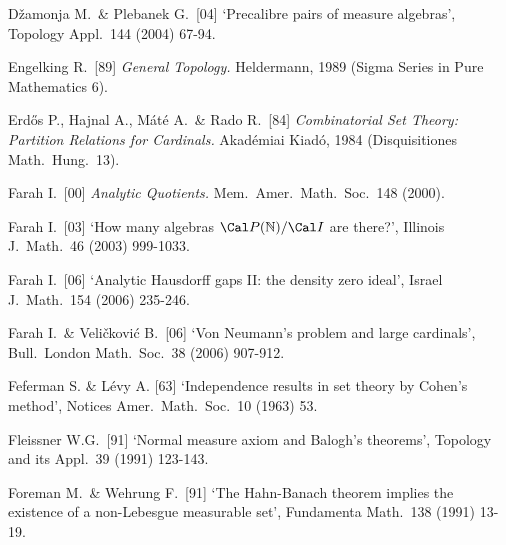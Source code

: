 {%

D\v{z}amonja M.\ \& Plebanek G.\ [04]
`Precalibre pairs of measure algebras',
Topology Appl.\ 144 (2004) 67-94.
\cmmnt{[525L.]}

\medskip%

Engelking R.\ [89] {\it General Topology.} Heldermann, 1989 (Sigma
Series in Pure Mathematics 6).
\cmmnt{[\S5A4.]}


Erd\H{o}s P., Hajnal A., M\'at\'e A.\ \& Rado R.\ [84] {\it Combinatorial
Set Theory:  Partition Relations for Cardinals.}   Akad\'emiai Kiad\'o,
1984 (Disquisitiones Math.\ Hung.\ 13).
\cmmnt{[5A1E, 5A1G, 5A6F.]}

\medskip%

Farah I.\ [00] {\it Analytic Quotients.}
Mem.\ Amer.\ Math.\ Soc.\ 148 (2000).
\cmmnt{[5A6H.]}

Farah I.\ [03] `How many algebras $\Cal P(\Bbb N)/\Cal I$ are there?',
Illinois J.\ Math.\ 46 (2003) 999-1033.
\cmmnt{[\S556 {\it notes\/}.]}

Farah I.\ [06] `Analytic Hausdorff gaps II: the density zero ideal',
Israel J.\ Math.\ 154 (2006) 235-246.
\cmmnt{[556S.]}

Farah I.\ \& Veli\v{c}kovi\'c B.\ [06]
`Von Neumann's problem and large cardinals',
Bull.\ London Math.\ Soc.\ 38 (2006) 907-912.
\cmmnt{[539Q.]}

Feferman S. \& L\'evy A. [63] `Independence results in set theory by Cohen's
method', Notices Amer.\ Math.\ Soc.\ 10 (1963) 53.
\cmmnt{[561A.]}

Fleissner W.G.\ [91]
`Normal measure axiom and Balogh's theorems', Topology and its Appl.\
39 (1991) 123-143.
\cmmnt{[555N.]}




Foreman M.\ \& Wehrung F.\ [91] `The Hahn-Banach theorem implies the
existence of a non-Lebesgue measurable set', Fundamenta Math.\ 138
(1991) 13-19.
\cmmnt{[563A.]}

}
